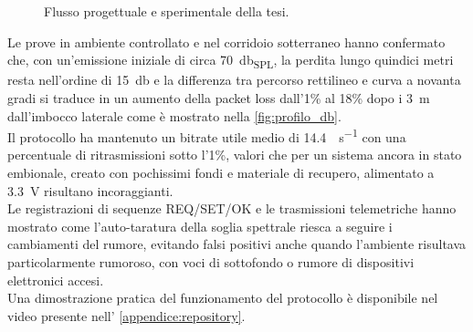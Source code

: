  \begin{figure}[H]
    \centering
    \begin{adjustbox}{width=0.9\linewidth}
\end{adjustbox}
    \caption{Flusso progettuale e sperimentale della tesi.}
    \label{fig:conclusioni_flusso}
\end{figure}


Le prove in ambiente controllato e nel corridoio sotterraneo hanno confermato che, con un'emissione iniziale di circa \SI{70}{\decibel_{SPL}}, 
la perdita lungo quindici metri resta nell'ordine di \SI{15}{\decibel} e la differenza tra percorso rettilineo e curva a novanta gradi si traduce in 
un aumento della packet loss dall'1\% al 18\% dopo i \SI{3}{\meter} dall'imbocco laterale come è mostrato nella \autoref{fig:profilo_db}.\\
 Il protocollo ha mantenuto un bitrate utile medio di \SI{14.4}{\bit\per\second} con una percentuale di ritrasmissioni sotto l'1\%,
  valori che per un sistema ancora in stato embionale, creato con pochissimi fondi e materiale di recupero, alimentato a \SI{3.3}{\volt} risultano incoraggianti.\\
   Le registrazioni di sequenze REQ/SET/OK e le trasmissioni telemetriche hanno mostrato come l'auto-taratura 
   della soglia spettrale riesca a seguire i cambiamenti del rumore, evitando falsi positivi anche quando l'ambiente risultava particolarmente rumoroso,
   con voci di sottofondo o rumore di dispositivi elettronici accesi.\\
   Una dimostrazione pratica del funzionamento del protocollo è disponibile nel video presente nell' \autoref{appendice:repository}.\\


